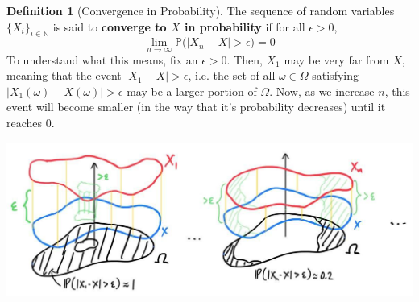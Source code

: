 \documentclass{article}
\theoremstyle{definition}
\theoremstyle{remark}
\theoremstyle{definition}
\newtheorem{definition}{Definition}[section]
\begin{document}
\begin{definition}[Convergence in Probability]
The sequence of random variables $\{ X_i\}_{i \in \mathbb{N}}$ is said to \textbf{converge to $X$ in probability} if for all $\epsilon > 0$, 
\[\lim_{n \rightarrow \infty} \mathbb{P} \big( |X_n - X| > \epsilon \big) = 0\]
To understand what this means, fix an $\epsilon > 0$. Then, $X_1$ may be very far from $X$, meaning that the event $|X_1 - X| > \epsilon$, i.e. the set of all $\omega \in \Omega$ satisfying $|X_1(\omega) - X (\omega)| > \epsilon$ may be a larger portion of $\Omega$. Now, as we increase $n$, this event will become smaller (in the way that it's probability decreases) until it reaches $0$. 
\begin{center}
    \includegraphics[scale=0.3]{img/convergence_in_probability.jpg}
\end{center}
\end{definition}
\end{document}
